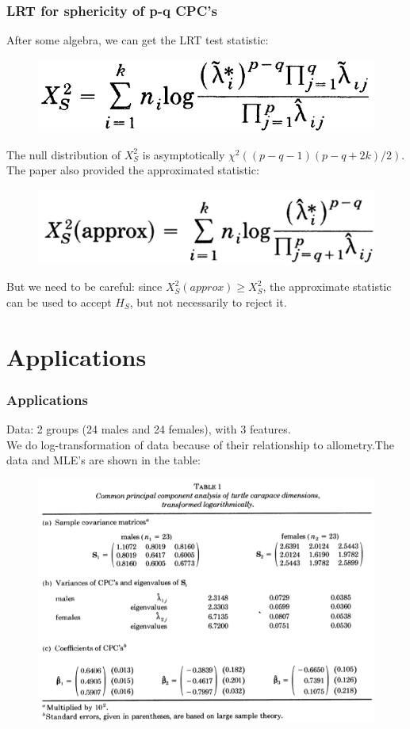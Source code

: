 \documentclass{beamer}
\begin{document}
	\begin{frame}
		\frametitle{LRT for sphericity of p-q CPC's}
		After some algebra, we can get the LRT test statistic:
		\begin{figure}
			\includegraphics[width=.4\linewidth]{image017.png}
		\end{figure}
		The null distribution of $X_S^2$ is asymptotically $\chi^2((p-q-1)(p-q+2k)/2)$.
		The paper also provided the approximated statistic:
		\begin{figure}
			\includegraphics[width=.4\linewidth]{image018.png}
		\end{figure}
		But we need to be careful: since $X_S^2(approx)\geq X_S^2$, the approximate statistic can be used to accept $H_S$, but not necessarily to reject it.
	\end{frame}
	
	
	\section{Applications}
	\begin{frame}
		\frametitle{Applications}
		Data: 2 groups (24 males and 24 females), with 3 features.\\
		We do log-transformation of data because of their relationship to allometry.The data and MLE's are shown in the table:
		\begin{figure}
			\includegraphics[width=.8\linewidth]{image019.png}
		\end{figure}
	\end{frame}
	
\end{document}
